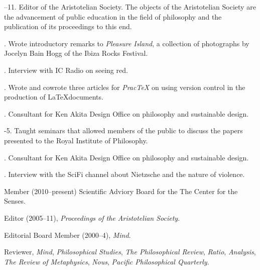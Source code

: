 \documentclass[11pt]{article}
\begin{document}
--11. Editor of the Aristotelian Society. The objects of the Aristotelian Society are the advancement of public education in the field of philosophy and the publication of its proceedings to this end. 

. Wrote introductory remarks to \emph{Pleasure Island}, a collection of photographs by Jocelyn Bain Hogg of the Ibiza Rocks Festival.

. Interview with IC Radio on seeing red.

. Wrote and cowrote three articles for \emph{PracTeX} on using version control in the production of \LaTeX documents.

. Consultant for Ken Akita Design Office on philosophy and sustainable design.

-5. Taught seminars that allowed members of the public to discuss the papers presented to the Royal Institute of Philosophy.

. Consultant for Ken Akita Design Office on philosophy and sustainable design.

. Interview with the SciFi channel about Nietzsche and the nature of violence.

\bigskip

\medskip


\ind Member (2010--present) Scientific Adviory Board for the The Center for the Senses.

\ind Editor (2005--11), \emph{Proceedings of the Aristotelian Society}.

\ind Editorial Board Member (2000--4), \emph{Mind}. 

\ind Reviewer, \emph{Mind}, \emph{Philosophical Studies},
\emph{The Philosophical Review}, \emph{Ratio}, \emph{Analysis}, \emph{The Review of Metaphysics}, \emph{Nous}, \emph{Pacific Philosophical Quarterly}.
\end{document}
